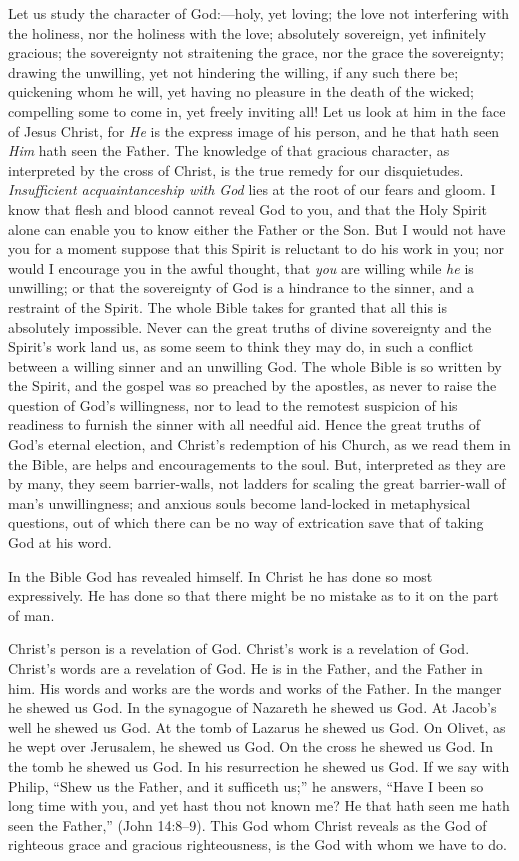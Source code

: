 \documentclass[
]{book}
\begin{document}
Let us study the character of God:---holy, yet loving; the love not interfering with the holiness, nor the holiness with the love; absolutely sovereign, yet infinitely gracious; the sovereignty not straitening the grace, nor the grace the sovereignty; drawing the unwilling, yet not hindering the willing, if any such there be; quickening whom he will, yet having no pleasure in the death of the wicked; compelling some to come in, yet freely inviting all! Let us look at him in the face of Jesus Christ, for \emph{He} is the express image of his person, and he that hath seen \emph{Him} hath seen the Father. The knowledge of that gracious character, as interpreted by the cross of Christ, is the true remedy for our disquietudes. \emph{Insufficient acquaintanceship with God} lies at the root of our fears and gloom. I know that flesh and blood cannot reveal God to you, and that the Holy Spirit alone can enable you to know either the Father or the Son. But I would not have you for a moment suppose that this Spirit is reluctant to do his work in you; nor would I encourage you in the awful thought, that \emph{you} are willing while \emph{he} is unwilling; or that the sovereignty of God is a hindrance to the sinner, and a restraint of the Spirit. The whole Bible takes for granted that all this is absolutely impossible. Never can the great truths of divine sovereignty and the Spirit's work land us, as some seem to think they may do, in such a conflict between a willing sinner and an unwilling God. The whole Bible is so written by the Spirit, and the gospel was so preached by the apostles, as never to raise the question of God's willingness, nor to lead to the remotest suspicion of his readiness to furnish the sinner with all needful aid. Hence the great truths of God's eternal election, and Christ's redemption of his Church, as we read them in the Bible, are helps and encouragements to the soul. But, interpreted as they are by many, they seem barrier-walls, not ladders for scaling the great barrier-wall of man's unwillingness; and anxious souls become land-locked in metaphysical questions, out of which there can be no way of extrication save that of taking God at his word.

In the Bible God has revealed himself. In Christ he has done so most expressively. He has done so that there might be no mistake as to it on the part of man.

Christ's person is a revelation of God. Christ's work is a revelation of God. Christ's words are a revelation of God. He is in the Father, and the Father in him. His words and works are the words and works of the Father. In the manger he shewed us God. In the synagogue of Nazareth he shewed us God. At Jacob's well he shewed us God. At the tomb of Lazarus he shewed us God. On Olivet, as he wept over Jerusalem, he shewed us God. On the cross he shewed us God. In the tomb he shewed us God. In his resurrection he shewed us God. If we say with Philip, ``Shew us the Father, and it sufficeth us;'' he answers, ``Have I been so long time with you, and yet hast thou not known me? He that hath seen me hath seen the Father,'' (John 14:8--9). This God whom Christ reveals as the God of righteous grace and gracious righteousness, is the God with whom we have to do.
\end{document}

